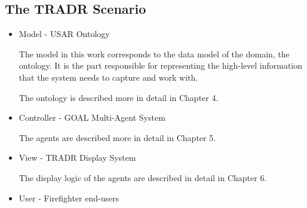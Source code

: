 \subsection{The TRADR Scenario}
\begin{itemize}
\item Model - USAR Ontology

The model in this work corresponds to the data model of the domain, the ontology. It is the part responsible for representing the high-level information that the system needs to capture and work with. 

The ontology is described more in detail in Chapter 4. 

\item Controller - GOAL Multi-Agent System

The agents are described more in detail in Chapter 5.

\item View - TRADR Display System


The display logic of the agents are described in detail in Chapter 6.

\item User - Firefighter end-users



\end{itemize}
